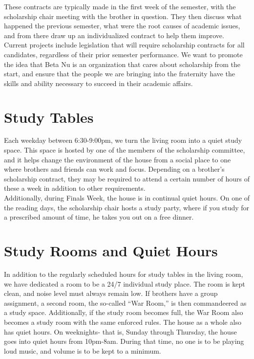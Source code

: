     These contracts are typically made in the first week of the semester, with the scholarship chair meeting with the brother in question. They then discuss what happened the previous semester, what were the root causes of academic issues, and from there draw up an individualized contract to help them improve. \\

    Current projects include legislation that will require scholarship contracts for all candidates, regardless of their prior semester performance. We want to promote the idea that Beta Nu is an organization that cares about scholarship from the start, and ensure that the people we are bringing into the fraternity have the skills and ability necessary to succeed in their academic affairs.    
    
  \section*{Study Tables}
    Each weekday between 6:30-9:00pm, we turn the living room into a quiet study space. This space is hosted by one of the members of the scholarship committee, and it helps change the environment of the house from a social place to one where brothers and friends can work and focus. Depending on a brother's scholarship contract, they may be required to attend a certain number of hours of these a week in addition to other requirements. \\
    
    Additionally, during Finals Week, the house is in continual quiet hours. On one of the reading days, the scholarship chair hosts a study party, where if you study for a prescribed amount of time, he takes you out on a free dinner.
    
  \section*{Study Rooms and Quiet Hours}
    In addition to the regularly scheduled hours for study tables in the living room, we have dedicated a room to be a 24/7 individual study place. The room is kept clean, and noise level must always remain low. If brothers have a group assignment, a second room, the so-called “War Room,” is then commandeered as a study space. Additionally, if the study room becomes full, the War Room also becomes a study room with the same enforced rules.  The house as a whole also has quiet hours. On weeknights- that is, Sunday through Thursday, the house goes into quiet hours from 10pm-8am. During that time, no one is to be playing loud music, and volume is to be kept to a minimum.
    
